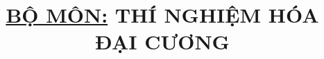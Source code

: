 \documentclass[12pt,a4paper,oneside]{book} %
\title{\underline{\textbf{BỘ MÔN:}} \textbf{THÍ NGHIỆM HÓA ĐẠI CƯƠNG}}
\begin{document}
\coverpage
\end{document}
